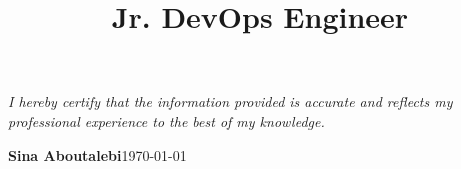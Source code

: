 \documentclass[11pt, a4paper, sans, final]{moderncv}
\title{Jr. DevOps Engineer}
\begin{document}
\maketitle







\emptysection{}\closesection{}
\vfill
\begin{center}
    \textit{I hereby certify that the information provided is accurate and reflects my professional experience to the best of my knowledge.}
    \vspace{1em}

    \textbf{Sina Aboutalebi}\hspace{4cm}\today
\end{center}
\end{document}
